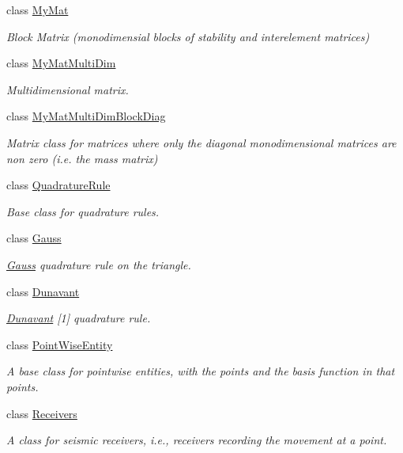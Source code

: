 \begin{DoxyCompactItemize}
class \hyperlink{classTspeed_1_1MyMat}{My\-Mat}
\begin{DoxyCompactList}\small\item\em Block Matrix (monodimensial blocks of stability and interelement matrices) \end{DoxyCompactList}\item 
class \hyperlink{classTspeed_1_1MyMatMultiDim}{My\-Mat\-Multi\-Dim}
\begin{DoxyCompactList}\small\item\em Multidimensional matrix. \end{DoxyCompactList}\item 
class \hyperlink{classTspeed_1_1MyMatMultiDimBlockDiag}{My\-Mat\-Multi\-Dim\-Block\-Diag}
\begin{DoxyCompactList}\small\item\em Matrix class for matrices where only the diagonal monodimensional matrices are non zero (i.\-e. the mass matrix) \end{DoxyCompactList}\item 
class \hyperlink{classTspeed_1_1QuadratureRule}{Quadrature\-Rule}
\begin{DoxyCompactList}\small\item\em Base class for quadrature rules. \end{DoxyCompactList}\item 
class \hyperlink{classTspeed_1_1Gauss}{Gauss}
\begin{DoxyCompactList}\small\item\em \hyperlink{classTspeed_1_1Gauss}{Gauss} quadrature rule on the triangle. \end{DoxyCompactList}\item 
class \hyperlink{classTspeed_1_1Dunavant}{Dunavant}
\begin{DoxyCompactList}\small\item\em \hyperlink{classTspeed_1_1Dunavant}{Dunavant} \mbox{[}1\mbox{]} quadrature rule. \end{DoxyCompactList}\item 
class \hyperlink{classTspeed_1_1PointWiseEntity}{Point\-Wise\-Entity}
\begin{DoxyCompactList}\small\item\em A base class for pointwise entities, with the points and the basis function in that points. \end{DoxyCompactList}\item 
class \hyperlink{classTspeed_1_1Receivers}{Receivers}
\begin{DoxyCompactList}\small\item\em A class for seismic receivers, i.\-e., receivers recording the movement at a point. \end{DoxyCompactList}\item 

\end{DoxyCompactItemize}
